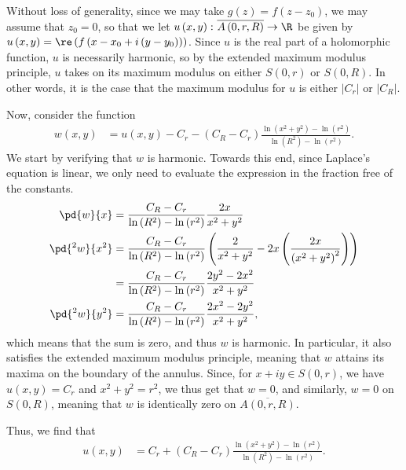 \documentclass[10pt]{mypackage}
\begin{document}
\begin{solution}
  Without loss of generality, since we may take $g(z) = f\left( z-z_0 \right)$, we may assume that $z_0 = 0$, so that we let $u\left( x,y \right)\colon \overline{A\left( 0,r,R \right)}\rightarrow \R$ be given by $ u\left( x,y \right) = \re\left( f\left( x-x_0 + i\left( y-y_0 \right) \right) \right) $. Since $u$ is the real part of a holomorphic function, $u$ is necessarily harmonic, so by the extended maximum modulus principle, $u$ takes on its maximum modulus on either $S\left( 0,r \right)$ or $S\left( 0,R \right)$. In other words, it is the case that the maximum modulus for $u$ is either $\left\vert C_r \right\vert$ or $\left\vert C_R \right\vert$.\newline

  Now, consider the function
  \begin{align*}
    w\left( x,y \right) &= u\left( x,y \right) - C_r - \left( C_R - C_r \right)\frac{\ln\left( x^2 + y^2 \right) - \ln\left( r^2 \right)}{\ln\left( R^2 \right) - \ln\left( r^2 \right)}.
  \end{align*}
  We start by verifying that $w$ is harmonic. Towards this end, since Laplace's equation is linear, we only need to evaluate the expression in the fraction free of the constants.
  \begin{align*}
    \pd{w}{x} &= \frac{C_R - C_r}{\ln\left( R^2 \right) - \ln\left( r^2 \right)}\frac{2x}{x^2 + y^2}\\
    \pd{^2w}{x^2} &= \frac{C_R - C_r}{\ln\left( R^2 \right) - \ln\left( r^2 \right)} \left( \frac{2}{x^2 + y^2} - 2x\left( \frac{2x}{\left( x^2 + y^2 \right)^2} \right) \right)\\
                  &= \frac{C_R - C_r}{\ln\left( R^2 \right) - \ln\left( r^2 \right)} \frac{2y^2 - 2x^2}{x^2 + y^2}\\
    \pd{^2w}{y^2} &= \frac{C_R - C_r}{\ln\left( R^2 \right) - \ln\left( r^2 \right)} \frac{2x^2 - 2y^2}{x^2 + y^2},
  \end{align*}
  which means that the sum is zero, and thus $w$ is harmonic. In particular, it also satisfies the extended maximum modulus principle, meaning that $w$ attains its maxima on the boundary of the annulus. Since, for $x + iy \in S\left( 0,r \right)$, we have $u\left( x,y \right) = C_r$ and $x^2 + y^2 = r^2$, we thus get that $w = 0$, and similarly, $w = 0$ on $S\left( 0,R \right)$, meaning that $w$ is identically zero on $ \overline{A\left( 0,r,R \right)} $.\newline

  Thus, we find that
  \begin{align*}
    u\left( x,y \right) &= C_r + \left( C_R - C_r \right) \frac{\ln\left( x^2 + y^2 \right) - \ln\left( r^2 \right)}{\ln\left( R^2 \right) - \ln\left( r^2 \right)}.
  \end{align*}
\end{solution}
\end{document}
